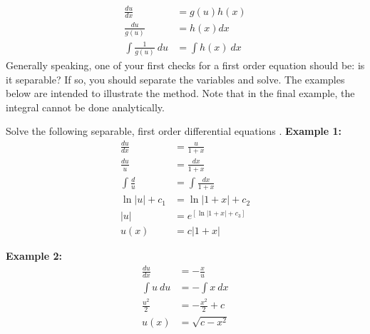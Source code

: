 \begin{align*}
\frac{du}{dx} &= g(u)h(x) \\
\frac{du}{g(u)} &= h(x) dx \\
\int \frac{1}{g(u)} \ du &= \int h(x) \ dx 
\end{align*}
Generally speaking, one of your first checks for a first order equation should be: is it separable?  If so, you should separate the variables and solve.  The examples below are intended to illustrate the method.  Note that in the final example, the integral cannot be done analytically.
\begin{example}[h!]
Solve the following separable, first order differential equations
.
\textbf{Example 1:} 
\begin{align*}
\frac{du}{dx} &= \frac{u}{1 + x} \\
\frac{du}{u} &= \frac{dx}{1+x} \\
\int \frac{d}{u} &= \int \frac{dx}{1+x} \\
\ln{|u|} + c_1 &= \ln{|1+x|} + c_2 \\
|u| &= e^{\left[\ln{|1+x|} + c_3\right]}\\
    u(x)&= c|1+x|
\end{align*}

\end{example}

\begin{example}[h!]
\textbf{Example 2:}
\begin{align*}
\frac{du}{dx} &= -\frac{x}{u} \\
\int u \ du &= -\int x \ dx \\
\frac{u^2}{2} &= -\frac{x^2}{2}+c \\
u(x) &= \sqrt{c - x^2}
\end{align*}
\end{example}

